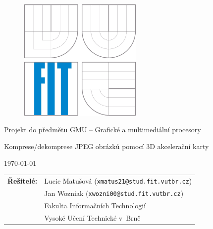 \begin{titlepage}

\vspace*{1cm}

\begin{figure}
  \centering
  \includegraphics[height=6cm]{images/fit.pdf}
\end{figure}

\vspace*{5mm}

\begin{center}
\begin{Large}
Projekt do předmětu GMU -- Grafické a multimediální procesory
\end{Large}
\end{center}

\vspace*{5mm}

\begin{center}
\begin{Huge}
Komprese/dekomprese JPEG obrázků pomocí 3D akcelerační karty \\
\end{Huge}
\end{center}

\vspace*{1cm}

\begin{center}
\begin{Large}
\today
\end{Large}
\end{center}

\vfill

\begin{flushleft}
\begin{large}
\begin{tabular}{ll}

\bf Řešitelé:\hspace{3mm} 
& Lucie Matušová (\verb_xmatus21@stud.fit.vutbr.cz_) \\
& Jan Wozniak (\verb_xwozni00@stud.fit.vutbr.cz_) \\
& Fakulta Informačních Technologií \\
& Vysoké Učení Technické v~Brně

\end{tabular}
\end{large}
\end{flushleft}

\end{titlepage}

